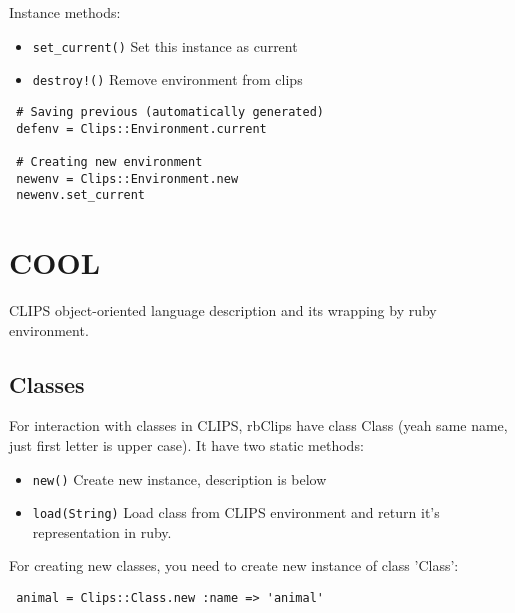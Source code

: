\documentclass[a4paper,10pt]{article}
\begin{document}
Instance methods:
\begin{itemize}
 \item \texttt{set\_current()} Set this instance as current
 \item \texttt{destroy!()} Remove environment from clips
\end{itemize}

\begin{verbatim}
 # Saving previous (automatically generated)
 defenv = Clips::Environment.current

 # Creating new environment
 newenv = Clips::Environment.new
 newenv.set_current
\end{verbatim}

\section{COOL}
CLIPS object-oriented language description and its wrapping by ruby environment.

\subsection{Classes}
For interaction with classes in CLIPS, rbClips have class Class (yeah same name, just first letter is upper case). It have two static methods:
\begin{itemize}
 \item \texttt{new()} Create new instance, description is below
 \item \texttt{load(String)} Load class from CLIPS environment and return it's representation in ruby.
\end{itemize}

For creating new classes, you need to create new instance of class 'Class':
\begin{verbatim}
 animal = Clips::Class.new :name => 'animal'
\end{verbatim}
\end{document}
